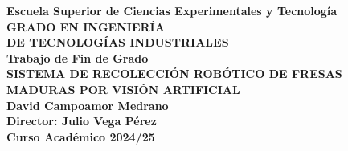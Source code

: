 \newpage
{
\color{white}
\pagecolor[rgb]{0,0.125,0.357} %

\thispagestyle{empty}

\begin{figure}[H]
  \centerline{}
\end{figure}

\begin{center}
  {\large {\bf Escuela Superior de Ciencias Experimentales y Tecnología}}\\[1.2cm]
  {\large {\bf GRADO EN INGENIERÍA\\ 
  DE TECNOLOGÍAS INDUSTRIALES}}\\[1.2cm]
  {\large {\bf Trabajo de Fin de Grado}}\\[1.2cm]
  {\Large{\bf SISTEMA DE RECOLECCIÓN ROBÓTICO DE FRESAS MADURAS POR VISIÓN ARTIFICIAL}}\\[2cm]
  {\large {\bf David Campoamor Medrano}}\\[2cm]
  {\large {\bf Director: Julio Vega Pérez}}\\[0.35cm]
  {\large {\bf Curso Académico 2024/25}}\\[1cm]
  
\end{center}

\clearpage
\nopagecolor
}



